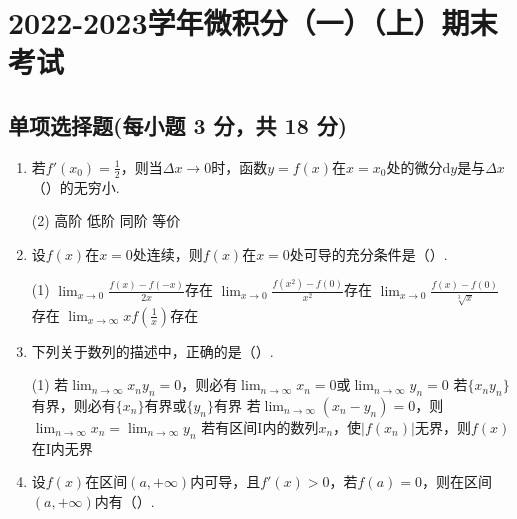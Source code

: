 \documentclass[../main.tex]{subfiles}
\begin{document}
\chapter{2022-2023学年微积分（一）（上）期末考试}

\section{单项选择题(每小题 3 分，共 18 分)}
\begin{enumerate}
    \item 若$f'(x_{0})=\frac{1}{2}$，则当$\Delta x\to0$时，函数$y=f(x)$在$x=x_{0}$处的微分$\mathrm{d}
              y$是与$\Delta x$（\qquad）的无穷小.

          \begin{tasks}[label=\textbf{\Alph*.}, label-width=1.5em, column-sep=1em](2)
              \task 高阶
              \task 低阶
              \task 同阶
              \task 等价
          \end{tasks}

    \item 设$f(x)$在$x=0$处连续，则$f(x)$在$x=0$处可导的充分条件是（\qquad）.

          \begin{tasks}[label=\textbf{\Alph*.}, label-width=1.5em, column-sep=1em](1)
              \task $\lim_{x\to0}\frac{f(x)-f(-x)}{2x}$存在
              \task $\lim_{x\to0}\frac{f(x^{2})-f(0)}{x^{2}}$存在
              \task $\lim_{x\to0}\frac{f(x)-f(0)}{\sqrt[3]{x}}$存在
              \task $\lim_{x\to\infty}x f\left(\frac{1}{x}\right)$存在
          \end{tasks}

    \item 下列关于数列的描述中，正确的是（\qquad）.

          \begin{tasks}[label=\textbf{\Alph*.}, label-width=1.5em, column-sep=1em](1)
              \task 若$\lim_{n\to\infty}x_{n} y_{n}=0$，则必有$\lim_{n\to\infty}x_{n}=0$或$\lim_{n\to\infty}y_{n}=0$
              \task 若$\{x_{n} y_{n}\}$有界，则必有$\{x_{n}\}$有界或$\{y_{n}\}$有界
              \task 若$\lim_{n\to\infty}(x_{n}-y_{n})=0$，则$\lim_{n\to\infty}x_{n}=\lim_{n\to\infty}y_{n}$
              \task 若有区间$\mathrm{I}$内的数列$x_{n}$，使$|f(x_{n})|$无界，则$f(x)$在$\mathrm{I}$内无界
          \end{tasks}

    \item 设$f(x)$在区间$(a,+\infty)$内可导，且$f'(x)>0$，若$f(a)=0$，则在区间$(a
              ,+\infty)$内有（\qquad）.


\end{enumerate}
\end{document}

